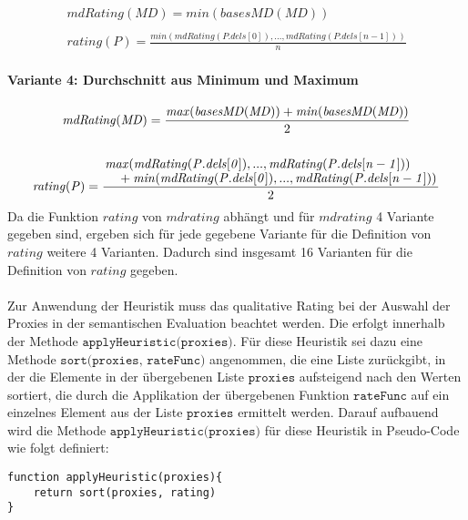 \documentclass[a4paper,12pt]{article}
\begin{document}
\begin{gather*}
\mathit{mdRating(MD)} = \mathit{min(basesMD(MD))}
\\\\
\mathit{rating(P)} = \frac{\mathit{min(mdRating(P.dels[0]),...,mdRating(P.dels[n-1]))}}{n}
\end{gather*}

\paragraph{Variante 4: Durchschnitt aus Minimum und Maximum}

\begin{gather*}
\mathit{mdRating(MD)} = \frac{\mathit{max(basesMD(MD))}+\mathit{min(basesMD(MD))}}{2}
\\\\
\mathit{rating(P)} = \frac{\splitfrac{ \mathit{max(mdRating(P.dels[0]),...,mdRating(P.dels[n-1]))}}{+\mathit{min(mdRating(P.dels[0]),...,mdRating(P.dels[n-1]))}}}{2}
\end{gather*}
\noindent
Da die Funktion $\mathit{rating}$ von $\mathit{mdrating}$ abhängt und für $\mathit{mdrating}$ 4 Variante gegeben sind, ergeben sich für jede gegebene Variante für die Definition von $\mathit{rating}$ weitere 4 Varianten. Dadurch sind insgesamt 16 Varianten für die Definition von $\mathit{rating}$ gegeben.\\\\
Zur Anwendung der Heuristik muss das qualitative Rating bei der Auswahl der Proxies in der semantischen Evaluation beachtet werden. Die erfolgt innerhalb der Methode $\texttt{applyHeuristic(proxies)}$. Für diese Heuristik sei dazu eine Methode $\texttt{sort(proxies, rateFunc)}$ angenommen, die eine Liste zurückgibt, in der die Elemente in der übergebenen Liste $\texttt{proxies}$ aufsteigend nach den Werten sortiert, die durch die Applikation der übergebenen Funktion $\texttt{rateFunc}$ auf ein einzelnes Element aus der Liste $\texttt{proxies}$ ermittelt werden. Darauf aufbauend wird die Methode $\texttt{applyHeuristic(proxies)}$ für diese Heuristik in Pseudo-Code wie folgt definiert:

\begin{lstlisting}[style = pseudo]
function applyHeuristic(proxies){
	return sort(proxies, rating)
}
\end{lstlisting}
\end{document}
